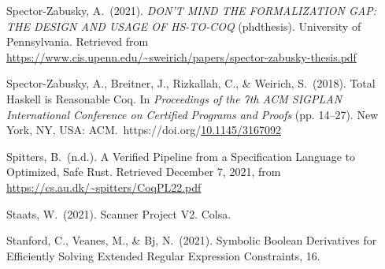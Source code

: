 \documentclass[12pt,twoside]{article}
\begin{document}
{\begin{thebibliography}{1079}
\mdbibitemlabel{}Spector-Zabusky, A.~(2021). \emph{DON’T MIND THE FORMALIZATION GAP: THE DESIGN AND USAGE OF HS-TO-COQ} (phdthesis). University of Pennsylvania. Retrieved from \href{https://www.cis.upenn.edu/~sweirich/papers/spector-zabusky-thesis.pdf}{{\ttfamily https://\hspace{0pt}www.\hspace{0pt}cis.\hspace{0pt}upenn.\hspace{0pt}edu/\hspace{0pt}\textasciitilde{}sweirich/\hspace{0pt}papers/\hspace{0pt}spector-\hspace{0pt}zabusky-\hspace{0pt}thesis.\hspace{0pt}pdf}}%

\mdbibitemlabel{}Spector-Zabusky, A., Breitner, J., Rizkallah, C., \& Weirich, S.~(2018). Total Haskell is Reasonable Coq. In \emph{Proceedings of the 7th ACM SIGPLAN International Conference on Certified Programs and Proofs} (pp. 14–27). New York, NY, USA: ACM.~https://doi.org/\href{https://dx.doi.org/10.1145/3167092}{10.1145/3167092}%

\mdbibitemlabel{}Spitters, B.~(n.d.). A Verified Pipeline from a Specification Language to Optimized, Safe Rust. Retrieved December 7, 2021, from \href{https://cs.au.dk/~spitters/CoqPL22.pdf}{{\ttfamily https://\hspace{0pt}cs.\hspace{0pt}au.\hspace{0pt}dk/\hspace{0pt}\textasciitilde{}spitters/\hspace{0pt}CoqPL22.\hspace{0pt}pdf}}%

\mdbibitemlabel{}Staats, W.~(2021). Scanner Project V2. Colsa.%

\mdbibitemlabel{}Stanford, C., Veanes, M., \& Bj, N.~(2021). Symbolic Boolean Derivatives for Efficiently Solving Extended Regular Expression Constraints, 16.%


\end{thebibliography}}
\end{document}
